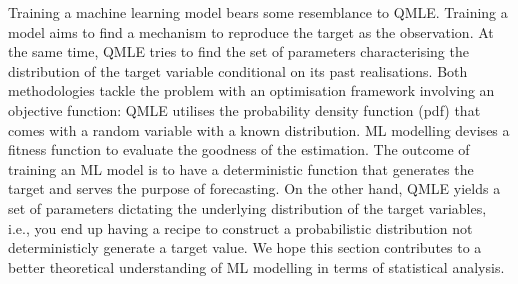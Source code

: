 Training a machine learning model bears some resemblance to QMLE. Training a model aims to find a mechanism to reproduce the target as the observation. At the same time, QMLE tries to find the set of parameters characterising the distribution of the target variable conditional on its past realisations. Both methodologies tackle the problem with an optimisation framework involving an objective function: QMLE utilises the probability density function (pdf) that comes with a random variable with a known distribution. ML modelling devises a fitness function to evaluate the goodness of the estimation. The outcome of training an ML model is to have a deterministic function that generates the target and serves the purpose of forecasting. On the other hand, QMLE yields a set of parameters dictating the underlying distribution of the target variables, i.e., you end up having a recipe to construct a probabilistic distribution not deterministicly generate a target value. We hope this section contributes to a better theoretical understanding of ML modelling in terms of statistical analysis.

